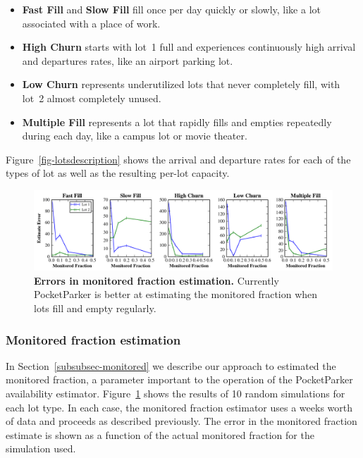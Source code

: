 \begin{itemize}

\item \textbf{Fast Fill} and \textbf{Slow Fill} fill once per day quickly or
slowly, like a lot associated with a place of work.

\item \textbf{High Churn} starts with lot~1 full and experiences continuously
high arrival and departures rates, like an airport parking lot.

\item \textbf{Low Churn} represents underutilized lots that never completely
fill, with lot~2 almost completely unused.

\item \textbf{Multiple Fill} represents a lot that rapidly fills and empties
repeatedly during each day, like a campus lot or movie theater.

\end{itemize}

Figure~\ref{fig-lotsdescription} shows the arrival and departure rates for
each of the types of lot as well as the resulting per-lot capacity.

\begin{figure}
\centering
\includegraphics[width=\textwidth]{./simulator/figures/capacity_experiment.pdf}

\caption{\textbf{Errors in monitored fraction estimation.} Currently
PocketParker is better at estimating the monitored fraction when lots fill
and empty regularly.}

\label{fig-capacityerrors}
\end{figure}

\subsubsection{Monitored fraction estimation}

In Section~\ref{subsubsec-monitored} we describe our approach to estimated
the monitored fraction, a parameter important to the operation of the
PocketParker availability estimator. Figure~\ref{fig-capacityerrors} shows
the results of 10 random simulations for each lot type. In each case, the
monitored fraction estimator uses a weeks worth of data and proceeds as
described previously. The error in the monitored fraction estimate is shown
as a function of the actual monitored fraction for the simulation used.

